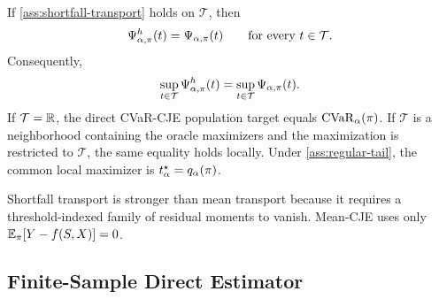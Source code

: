 \begin{theorem}
\label{thm:formal-cvar-identification}
If \cref{ass:shortfall-transport} holds on $\mathcal{T}$, then
\[
\Psi^h_{\alpha,\pi}(t)=\Psi_{\alpha,\pi}(t)
\qquad\text{for every }t\in\mathcal{T}.
\]
Consequently,
\[
\sup_{t\in\mathcal{T}}\Psi^h_{\alpha,\pi}(t)
=
\sup_{t\in\mathcal{T}}\Psi_{\alpha,\pi}(t).
\]
If $\mathcal{T}=\mathbb{R}$, the direct CVaR-CJE population target equals
$\mathrm{CVaR}_\alpha(\pi)$. If $\mathcal{T}$ is a neighborhood containing the
oracle maximizers and the maximization is restricted to $\mathcal{T}$, the
same equality holds locally. Under \cref{ass:regular-tail}, the common local
maximizer is $t_\alpha^\star=q_\alpha(\pi)$.
\end{theorem}

\begin{twocolproof}
\end{twocolproof}

Shortfall transport is stronger than mean transport because it requires a
threshold-indexed family of residual moments to vanish. Mean-CJE uses only
$\mathbb{E}_\pi[Y-f(S,X)]=0$.

\subsection{Finite-Sample Direct Estimator}

